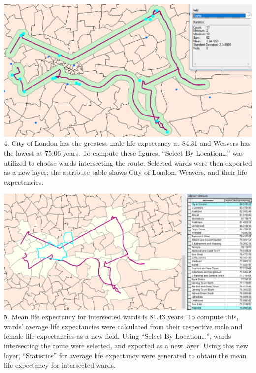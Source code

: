 \documentclass[]{article}
\begin{document}
\includegraphics[width=25.85in]{4} 4. City of London has the greatest
male life expectancy at 84.31 and Weavers has the lowest at 75.06 years.
To compute these figures, ``Select By Location\ldots{}'' was utilized to
choose wards intersecting the route. Selected wards were then exported
as a new layer; the attribute table shows City of London, Weavers, and
their life expectancies.

\includegraphics[width=30.94in]{5} 5. Mean life expectancy for
intersected wards is 81.43 years. To compute this, wards' average life
expectancies were calculated from their respective male and female life
expectancies as a new field. Using ``Select By Location\ldots{}'', wards
intersecting the route were selected, and exported as a new layer. Using
this new layer, ``Statistics'' for average life expectancy were
generated to obtain the mean life expectancy for intersected wards.
\end{document}
